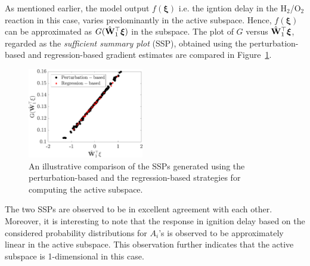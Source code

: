As mentioned earlier, the model output $f(\bm{\xi})$ i.e. the igntion delay in the
H$_2$/O$_2$ reaction in this case, varies
 predominantly in the active subspace. Hence, 
$f(\bm{\xi})$ can be approximated as $G(\hat{\mathbf{{W}}}_1^\top\bm{\xi})$ in
the subspace. The plot of $G$ versus $\hat{\mathbf{{W}}}_1^\top\bm{\xi}$, 
regarded as the \textit{sufficient summary plot} (SSP), obtained using the perturbation-based and
regression-based gradient estimates are
compared in Figure~\ref{fig:comp_ssp}.
%
\begin{figure}[htbp]
 \begin{center}
  \includegraphics[width=0.45\textwidth]{./Figures/comp_ssp}
\caption{An illustrative comparison of the SSPs generated using the 
perturbation-based and the regression-based strategies for computing the active subspace.}
\label{fig:comp_ssp}
\end{center}
\end{figure}
%
The two SSPs are observed to be in excellent agreement with each other. Moreover, it is interesting to note
that the response in ignition
delay based on the considered probability distributions for $A_i$'s is observed to be approximately linear in the
active subspace. This observation further indicates that the active subspace is 1-dimensional in this case.

